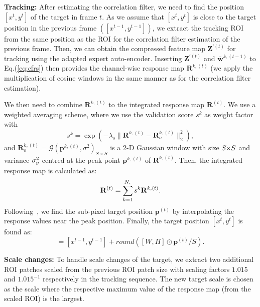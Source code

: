 \documentclass[10pt,twocolumn,letterpaper]{article}
\begin{document}
\textbf{Tracking: }
After estimating the correlation filter, we need to find the position $[x^t, y^t]$ of the target in frame $t$. 
As we assume that $[x^t, y^t]$ is close to the target position in the previous frame $\left([x^{t-1}, y^{t-1}]\right)$, we extract the tracking ROI from the same position as the ROI for the correlation filter estimation of the previous frame.
Then, we can obtain the compressed feature map $\mathbf{Z}^{'(t)}$ for tracking using the adapted expert auto-encoder. 
Inserting $\mathbf{Z}^{'(t)}$ and $\bar{\mathbf{w}}^{k,(t-1)}$ to Eq.(\ref{eq:cfrs}) then provides the channel-wise response map $\mathbf{R}^{k,(t)}$ 
(we apply the multiplication of cosine windows in the same manner as for the correlation filter estimation).

We then need to combine $\mathbf{R}^{k,(t)}$ to the integrated response map $\mathbf{R}^{(t)}$. 
We use a weighted averaging scheme, where we use the validation score $s^k$ as weight factor with
\begin{equation}
s^k = \exp\left(-\lambda_s\| \mathbf{R}^{k,(t)} - \mathbf{R}_o^{k,(t)} \|_2^2\right),
\end{equation}
and $\mathbf{R}_o^{k,(t)}=\mathcal{G}(\mathbf{p}^{k,(t)},\sigma^2)_{S\times S}$ is a 2-D Gaussian window with size ${\small S\hspace{-1mm}\times\hspace{-1mm} S}$ and variance ${\small \sigma_y^2}$ centred at the peak point $\mathbf{p}^{k,(t)}$ of $\mathbf{R}^{k,(t)}$. 
Then, the integrated response map is calculated as:
\vspace{-2mm}
\begin{equation}
\mathbf{R}^{(t)} = \sum_{k=1}^{N_c} s^k \mathbf{R}^{k,(t)}.
\vspace{-2mm}
\end{equation}
Following~\cite{ref:ACFN}, we find the sub-pixel target position $\mathbf{p}^{(t)}$ by interpolating the response values near the peak position.
Finally, the target position $[x^t, y^t]$ is found as:
\begin{equation}
[x^t, y^t] = [x^{t-1}, y^{t-1}] + round( [W, H]\odot\mathbf{p}^{(t)}/S ).
\end{equation}

\textbf{Scale changes: }
To handle scale changes of the target, we extract two additional ROI patches scaled from the previous ROI patch size with scaling factors $1.015$ and $1.015^{-1}$ respectively in the tracking sequence. 
The new target scale is chosen as the scale where the respective maximum value of the response map (from the scaled ROI) is the largest.
\end{document}
